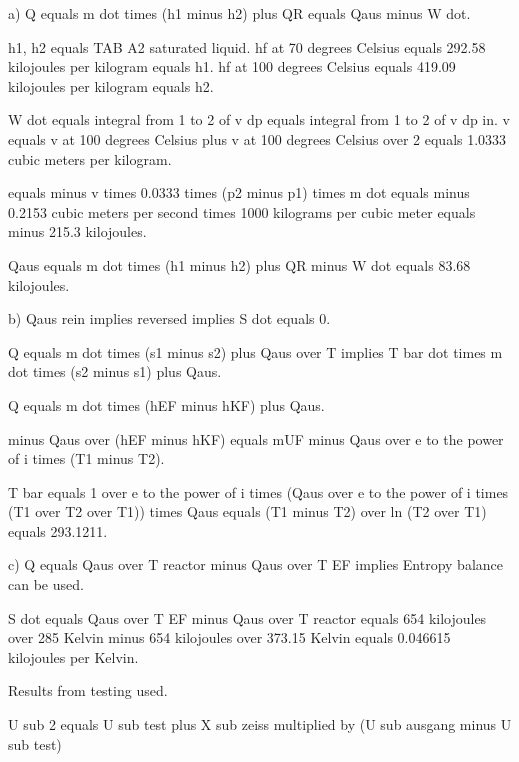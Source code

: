 a) Q equals m dot times (h1 minus h2) plus QR equals Qaus minus W dot.

h1, h2 equals TAB A2 saturated liquid. hf at 70 degrees Celsius equals 292.58 kilojoules per kilogram equals h1. hf at 100 degrees Celsius equals 419.09 kilojoules per kilogram equals h2.

W dot equals integral from 1 to 2 of v dp equals integral from 1 to 2 of v dp in. v equals v at 100 degrees Celsius plus v at 100 degrees Celsius over 2 equals 1.0333 cubic meters per kilogram.

equals minus v times 0.0333 times (p2 minus p1) times m dot equals minus 0.2153 cubic meters per second times 1000 kilograms per cubic meter equals minus 215.3 kilojoules.

Qaus equals m dot times (h1 minus h2) plus QR minus W dot equals 83.68 kilojoules.

b) Qaus rein implies reversed implies S dot equals 0.

Q equals m dot times (s1 minus s2) plus Qaus over T implies T bar dot times m dot times (s2 minus s1) plus Qaus.

Q equals m dot times (hEF minus hKF) plus Qaus.

minus Qaus over (hEF minus hKF) equals mUF minus Qaus over e to the power of i times (T1 minus T2).

T bar equals 1 over e to the power of i times (Qaus over e to the power of i times (T1 over T2 over T1)) times Qaus equals (T1 minus T2) over ln (T2 over T1) equals 293.1211.

c) Q equals Qaus over T reactor minus Qaus over T EF implies Entropy balance can be used.

S dot equals Qaus over T EF minus Qaus over T reactor equals 654 kilojoules over 285 Kelvin minus 654 kilojoules over 373.15 Kelvin equals 0.046615 kilojoules per Kelvin.

Results from testing used.

U sub 2 equals U sub test plus X sub zeiss multiplied by (U sub ausgang minus U sub test)